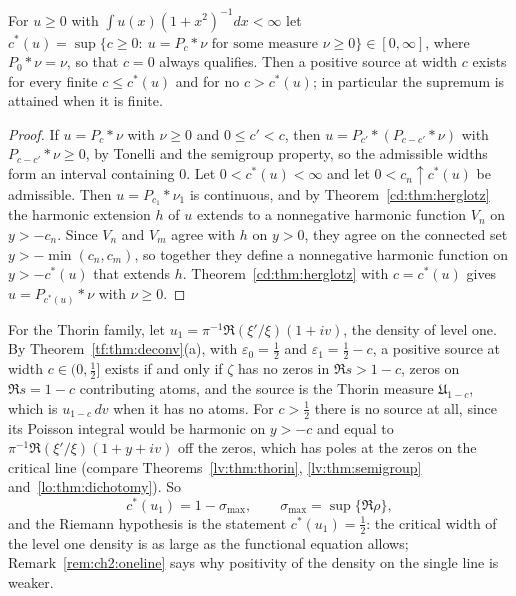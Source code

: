 \begin{proposition}\label{cd:prop:critical}
For $u\ge0$ with $\int u(x)(1+x^2)^{-1}dx<\infty$ let $c^*(u)=\sup\{c\ge0:\ u=P_c*\nu\text{ for some measure }\nu\ge0\}\in[0,\infty]$, where $P_0*\nu=\nu$, so that $c=0$ always qualifies. Then a positive source at width $c$ exists for every finite $c\le c^*(u)$ and for no $c>c^*(u)$; in particular the supremum is attained when it is finite.
\end{proposition}

\begin{proof}
If $u=P_c*\nu$ with $\nu\ge0$ and $0\le c'<c$, then $u=P_{c'}*(P_{c-c'}*\nu)$ with $P_{c-c'}*\nu\ge0$, by Tonelli and the semigroup property, so the admissible widths form an interval containing $0$. Let $0<c^*(u)<\infty$ and let $0<c_n\uparrow c^*(u)$ be admissible. Then $u=P_{c_1}*\nu_1$ is continuous, and by Theorem~\ref{cd:thm:herglotz} the harmonic extension $h$ of $u$ extends to a nonnegative harmonic function $V_n$ on $y>-c_n$. Since $V_n$ and $V_m$ agree with $h$ on $y>0$, they agree on the connected set $y>-\min(c_n,c_m)$, so together they define a nonnegative harmonic function on $y>-c^*(u)$ that extends $h$. Theorem~\ref{cd:thm:herglotz} with $c=c^*(u)$ gives $u=P_{c^*(u)}*\nu$ with $\nu\ge0$.
\end{proof}

For the Thorin family, let $u_1=\pi^{-1}\Re(\xi'/\xi)(1+iv)$, the density of level one. By Theorem~\ref{tf:thm:deconv}(a), with $\varepsilon_0=\tfrac12$ and $\varepsilon_1=\tfrac12-c$, a positive source at width $c\in(0,\tfrac12]$ exists if and only if $\zeta$ has no zeros in $\Re s>1-c$, zeros on $\Re s=1-c$ contributing atoms, and the source is the Thorin measure $\mathfrak U_{1-c}$, which is $u_{1-c}\,dv$ when it has no atoms. For $c>\tfrac12$ there is no source at all, since its Poisson integral would be harmonic on $y>-c$ and equal to $\pi^{-1}\Re(\xi'/\xi)(1+y+iv)$ off the zeros, which has poles at the zeros on the critical line (compare Theorems~\ref{lv:thm:thorin}, \ref{lv:thm:semigroup} and~\ref{lo:thm:dichotomy}). So
\[
c^*(u_1)=1-\sigma_{\max},\qquad\sigma_{\max}=\sup\{\Re\rho\},
\]
and the Riemann hypothesis is the statement $c^*(u_1)=\tfrac12$: the critical width of the level one density is as large as the functional equation allows; Remark~\ref{rem:ch2:oneline} says why positivity of the density on the single line is weaker.


